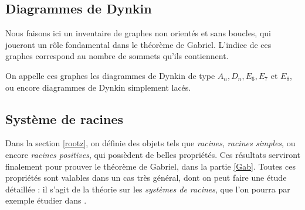 \documentclass[a4paper,11pt]{article}
\begin{document}
\subsection{Diagrammes de Dynkin}
Nous faisons ici un inventaire de graphes non orientés et sans boucles, qui joueront un rôle fondamental dans le théorème de Gabriel. L'indice de ces graphes correspond au nombre de sommets qu'ils contiennent. 
\begin{center}
\end{center}
On appelle ces graphes les diagrammes de Dynkin de type $A_n,D_n,E_6,E_7$ et $E_8$, ou encore diagrammes de Dynkin simplement lacés.
\subsection{Système de racines}
\label{syst_root}
Dans la section \ref{rootz}, on définie des objets tels que \emph{racines}, \emph{racines simples}, ou encore \emph{racines positives}, qui possèdent de belles propriétés. Ces résultats serviront finalement pour prouver le théorème de Gabriel, dans la partie \ref{Gab}. Toutes ces propriétés sont valables dans un cas très général, dont on peut faire une étude détaillée : il s'agit de la théorie sur les \emph{systèmes de racines}, que l'on pourra par exemple étudier dans \cite{S66}.
\clearpage
\end{document}

